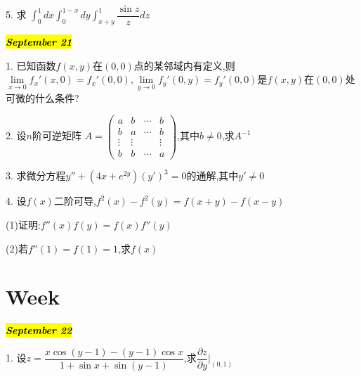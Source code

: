 5. 求 $\int_{0}^{1}dx\int_{0}^{1-x}dy\int_{x+y}^{1}\dfrac{\sin z}{z}dz$
\begin{solution}
	
\end{solution}

\hl{\textbf{\textit{September 21}}}

1. 已知函数$f(x,y)$在$(0,0)$点的某邻域内有定义,则$\lim\limits_{x\rightarrow 0}f_{x}'(x,0)=f_{x}'(0,0),\lim\limits_{y\rightarrow 0}f_{y}'(0,y)=f_{y}'(0,0)$是$f(x,y)$在$(0,0)$处可微的什么条件?
\begin{solution}
	
\end{solution}

2. 设$n$阶可逆矩阵 $A=\begin{pmatrix}
	a&b&\cdots&b\\
	b&a&\cdots&b\\
	\vdots&\vdots&&\vdots\\
	b&b&\cdots&a
\end{pmatrix}$,其中$b\neq 0$,求$A^{-1}$
\begin{solution}
	
\end{solution}

3. 求微分方程$y''+(4x+e^{2y})(y')^3=0$的通解,其中$y'\neq 0$
\begin{solution}
	
\end{solution}

4. 设$f(x)$二阶可导,$f^{2}(x)-f^{2}(y)=f(x+y)-f(x-y)$

(1)证明:$f''(x)f(y)=f(x)f''(y)$

(2)若$f''(1)=f(1)=1$,求$f(x)$
\begin{solution}
	
\end{solution}

\section{Week }
\hl{\textbf{\textit{September 22}}}

1. 设$z=\dfrac{x\cos(y-1)-(y-1)\cos x}{1+\sin x+\sin(y-1)}$,求$\dfrac{\partial z}{\partial y}|_{(0,1)}$
\begin{solution}
	
\end{solution}

